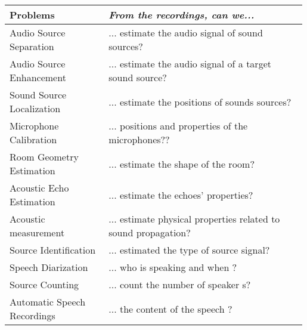 \begin{tabular}{p{0.33\linewidth} p{0.66\linewidth}}
    \toprule
    Problems & \textit{From the recordings, can we...} \\
    \midrule
    Audio Source Separation   & ... estimate the audio signal of sound sources?\\

    Audio Source Enhancement   & ... estimate the audio signal of a target sound source?\\

    Sound Source Localization & ... estimate the positions of sounds sources? \\

    Microphone Calibration    & ... positions and properties of the microphones?? \\

    Room Geometry Estimation  & ... estimate the shape of the room? \\

    Acoustic Echo Estimation  & ... estimate the echoes' properties? \\

    Acoustic measurement      & ... estimate physical properties related to sound propagation?\\

    \hline
    Source Identification     & ... estimated the type of source signal?\\

    Speech Diarization        & ... who is speaking and when ? \\

    Source Counting           & ... count the number of speaker s? \\

    Automatic Speech Recordings & ... the content of the speech ? \\

    \bottomrule
\end{tabular}